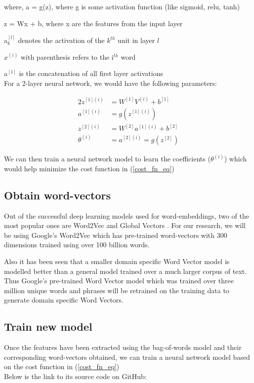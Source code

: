 \noindent where, a = g(z), where g is some activation function (like sigmoid, relu, tanh)

\quad\quad z = Wx + b, where x are the features from the input layer

\quad\quad a$^{[l]}_{k}$ denotes the activation of the $k^{th}$ unit in layer $l$

\quad\quad $x^{(i)}$ with parenthesis refers to the i$^{th}$ word

\quad\quad a$^{[1]}$ is the concatenation of all first layer activations\\

\noindent For a 2-layer neural network, we would have the following parameters:

\begin{alignat}{2}
z^{[1](i)} & = W^{[1]}V^{(i)} + b^{[1]}\\
a^{[1](i)} & = g(z^{[1](i)})\\
z^{[2](i)} & = W^{[2]}a^{[1](i)} + b^{[2]}\\
\theta^{(i)} & = a^{[2](i)} = g(z^{[2]})
\end{alignat}

\noindent We can then train a neural network model to learn the coefficients ($\theta^{(i)}$) which would help minimize the cost function in (\ref{cost_fn_eq})


\subsection{Obtain word-vectors}

Out of the successful deep learning models used for word-embeddings, two of the most popular ones are Word2Vec \cite{le2014distributed} and Global Vectors \cite{pennington2014glove}. For our research, we will be using Google's Word2Vec which has pre-trained word-vectors with 300 dimensions trained using over 100 billion words. 

Also it has been seen that a smaller domain specific Word Vector model is modelled better than a general model trained over a much larger corpus of text. Thus Google's pre-trained Word Vector model which was trained over three million unique words and phrases will be retrained on the training data to generate domain specific Word Vectors.

\subsection{Train new model}

Once the features have been extracted using the bag-of-words model and their corresponding word-vectors obtained, we can train a neural network model based on the cost function in (\ref{cost_fn_eq})\\

\noindent Below is the link to its source code on GitHub:

